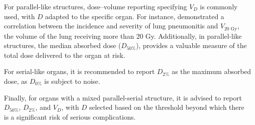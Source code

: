 For parallel-like structures, dose–volume reporting specifying $V_D$ is commonly used, with $D$ adapted to the specific organ.
For instance, \cite{Graham1995} demonstrated a correlation between the incidence and severity of lung pneumonitis and $V_{20 \text{ Gy}}$, the volume of the lung receiving more than 20 Gy.
Additionally, in parallel-like structures, the median absorbed dose ($D_{50\%}$), provides a valuable measure of the total dose delivered to the organ at risk.

For serial-like organs, it is recommended to report $D_{2\%}$ as the maximum absorbed dose, as $D_{0\%}$ is subject to noise.

Finally, for organs with a mixed parallel-serial structure, it is advised to report $D_{50\%}$, $D_{2\%}$, and $V_D$, with $D$ selected based on the threshold beyond which there is a significant risk of serious complications.

